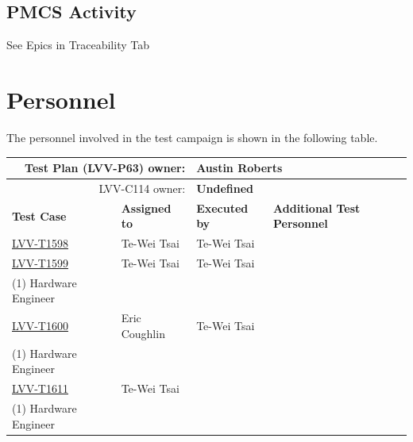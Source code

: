 \documentclass[SE,lsstdraft,STR,toc]{lsstdoc}
\begin{document}
  \subsection{PMCS Activity}
  See Epics in Traceability Tab


\newpage
\section{Personnel}
\label{sect:personnel}

The personnel involved in the test campaign is shown in the following table.

\begin{longtable}{p{3cm}p{3cm}p{3cm}p{6cm}}
\hline
\multicolumn{2}{r}{Test Plan (LVV-P63) owner:} &
\multicolumn{2}{l}{\textbf{ Austin Roberts } }\\\hline
\multicolumn{2}{r}{ LVV-C114 owner:} &
\multicolumn{2}{l}{\textbf{
    Undefined
}
} \\\hline
\textbf{Test Case} & \textbf{Assigned to} & \textbf{Executed by} & \textbf{Additional Test Personnel} \\ \hline
\href{https://jira.lsstcorp.org/secure/Tests.jspa#/testCase/LVV-T1598}{LVV-T1598}
& {\small Te-Wei Tsai } & {\small Te-Wei Tsai } &
\begin{minipage}[]{6cm}
\smallskip
{\small  }
\medskip
\end{minipage}
\\ \hline
\href{https://jira.lsstcorp.org/secure/Tests.jspa#/testCase/LVV-T1599}{LVV-T1599}
& {\small Te-Wei Tsai } & {\small Te-Wei Tsai } &
\begin{minipage}[]{6cm}
\smallskip
{\small (1) Software Engineer\\
(1) Hardware Engineer
 }
\medskip
\end{minipage}
\\ \hline
\href{https://jira.lsstcorp.org/secure/Tests.jspa#/testCase/LVV-T1600}{LVV-T1600}
& {\small Eric Coughlin } & {\small Te-Wei Tsai } &
\begin{minipage}[]{6cm}
\smallskip
{\small (1) Software Engineer\\
(1) Hardware Engineer
 }
\medskip
\end{minipage}
\\ \hline
\href{https://jira.lsstcorp.org/secure/Tests.jspa#/testCase/LVV-T1611}{LVV-T1611}
& {\small Te-Wei Tsai } & {\small  } &
\begin{minipage}[]{6cm}
\smallskip
{\small (1) Software Engineer\\
(1) Hardware Engineer
 }
\medskip
\end{minipage}
\\ \hline
\end{longtable}
\end{document}
